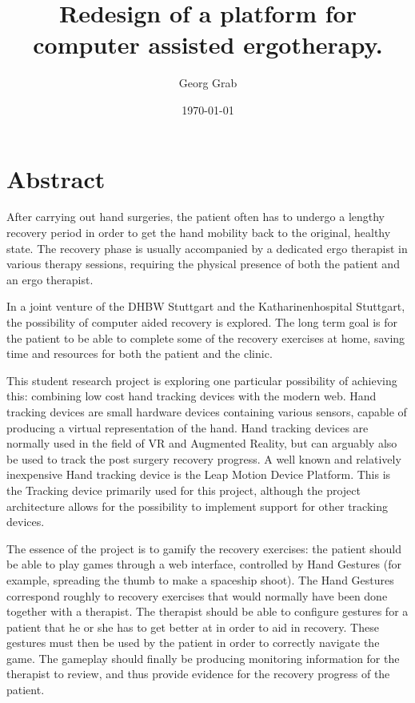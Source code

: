 \documentclass[fontsize=12pt,a4paper,draft]{scrartcl}[2018/05/07]
\title{Redesign of a platform for computer assisted ergotherapy.}
\author{Georg Grab}
\date{\today}               %
\begin{document}
\maketitle                  %
\tableofcontents            %

\section{Abstract}
After carrying out hand surgeries, the patient often has to undergo a lengthy recovery period in order to get the hand mobility back to the original, healthy state. The recovery phase is usually accompanied by a dedicated ergo therapist in various therapy sessions, requiring the physical presence of both the patient and an ergo therapist.

In a joint venture of the DHBW Stuttgart and the Katharinenhospital Stuttgart, the possibility of computer aided recovery is explored. The long term goal is for the patient to be able to complete some of the recovery exercises at home, saving time and resources for both the patient and the clinic.

This student research project is exploring one particular possibility of achieving this: combining low cost hand tracking devices with the modern web. Hand tracking devices are small hardware devices containing various sensors, capable of producing a virtual representation of the hand. Hand tracking devices are normally used in the field of VR and Augmented Reality, but can arguably also be used to track the post surgery recovery progress. A well known and relatively inexpensive Hand tracking device is the Leap Motion Device Platform. This is the Tracking device primarily used for this project, although the project architecture allows for the possibility to implement support for other tracking devices.

The essence of the project is to gamify the recovery exercises: the patient should be able to play games through a web interface, controlled by Hand Gestures (for example, spreading the thumb to make a spaceship shoot). The Hand Gestures correspond roughly to recovery exercises that would normally have been done together with a therapist. The therapist should be able to configure gestures for a patient that he or she has to get better at in order to aid in recovery. These gestures must then be used by the patient in order to correctly navigate the game. The gameplay should finally be producing monitoring information for the therapist to review, and thus provide evidence for the recovery progress of the patient.
\end{document}
